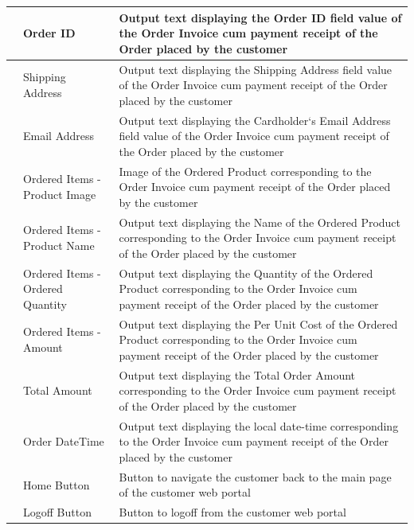 \documentclass[hidelinks,a4paper,12pt]{article}
\begin{document}
\begin{center}
{\begin{tabularx}{\textwidth}{ | >{\ttfamily\raggedright\arraybackslash} s 
	| >{\ttfamily\raggedright\arraybackslash} t 
	| >{\ttfamily\raggedright\arraybackslash} t | }
	 & Order ID & Output text displaying the Order ID field value of the Order Invoice cum payment receipt of the Order placed by the customer  \\
	 & Shipping Address & Output text displaying the Shipping Address field value of the Order Invoice cum payment receipt of the Order placed by the customer \\
	 & Email Address & Output text displaying the Cardholder`s Email Address field value of the Order Invoice cum payment receipt of the Order placed by the customer  \\
	 & Ordered Items - Product Image & Image of the Ordered Product corresponding to the Order Invoice cum payment receipt of the Order placed by the customer  \\
	 & Ordered Items - Product Name & Output text displaying the Name of the Ordered Product corresponding to the Order Invoice cum payment receipt of the Order placed by the customer  \\
	 & Ordered Items - Ordered Quantity & Output text displaying the Quantity of the Ordered Product corresponding to the Order Invoice cum payment receipt of the Order placed by the customer \\
	 & Ordered Items - Amount & Output text displaying the Per Unit Cost of the Ordered Product corresponding to the Order Invoice cum payment receipt of the Order placed by the customer  \\
	 & Total Amount & Output text displaying the Total Order Amount corresponding to the Order Invoice cum payment receipt of the Order placed by the customer  \\
	 & Order DateTime &  Output text displaying the local date-time corresponding to the Order Invoice cum payment receipt of the Order placed by the customer \\
	 & Home Button & Button to navigate the customer back to the main page of the customer web portal \\
	 & Logoff Button & Button to logoff from the customer web portal \\
	\hline				
	\end{tabularx}
	}
\end{center}
\end{document}
